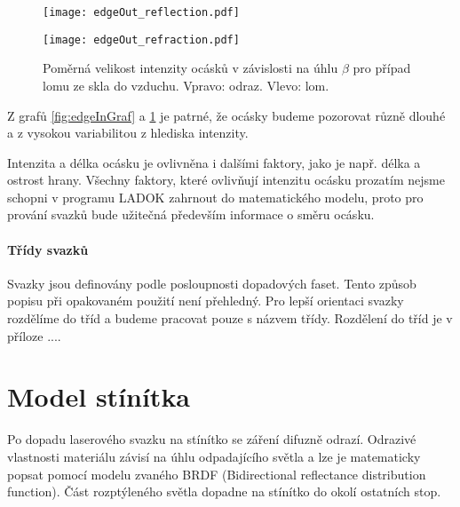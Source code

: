 \begin{figure}[h!]
\centering
\begin{minipage}[c]{0.48\textwidth}
\texttt{[image: edgeOut\_reflection.pdf]}
\end{minipage}
\begin{minipage}[c]{0.48\textwidth}
\texttt{[image: edgeOut\_refraction.pdf]}
\end{minipage}
\caption[Poměrná velikost intenzity ocásku případ lomu ze skla do vzduchu.]{Poměrná velikost intenzity ocásků v závislosti na úhlu $\beta$ pro případ lomu ze skla do vzduchu. Vpravo: odraz. Vlevo: lom.}
\label{fig:edgeOutGraf}
\end{figure}

Z grafů \ref{fig:edgeInGraf} a \ref{fig:edgeOutGraf} je patrné, že ocásky budeme pozorovat různě dlouhé a z vysokou variabilitou z hlediska intenzity. 
	  
 Intenzita a délka ocásku je ovlivněna i dalšími faktory, jako je např. délka a ostrost hrany. Všechny faktory, které ovlivňují intenzitu ocásku prozatím nejsme schopni v programu LADOK zahrnout do matematického modelu, proto pro prování svazků bude užitečná především informace o směru ocásku. 
 
 \newpage
 \paragraph{Třídy svazků}
 \hspace{1mm}
 
 Svazky jsou definovány podle posloupnosti dopadových faset. Tento způsob popisu při opakovaném použití není přehledný.
 Pro lepší orientaci svazky rozdělíme do tříd a budeme pracovat pouze s názvem třídy. Rozdělení do tříd je v příloze ....  


\section{Model stínítka}
\label{sec:stinitko}
Po dopadu laserového svazku na stínítko se záření difuzně odrazí. Odrazivé vlastnosti materiálu závisí na úhlu odpadajícího světla a lze je matematicky popsat pomocí modelu zvaného BRDF (Bidirectional reflectance distribution function). Část rozptýleného světla dopadne na stínítko do okolí ostatních stop. 



